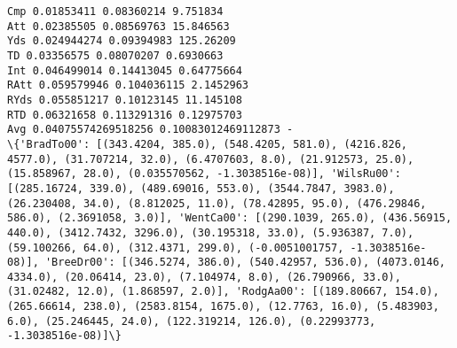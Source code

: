 \documentclass[11pt]{article}
\begin{document}
    \begin{Verbatim}[commandchars=\\\{\}]
Cmp 0.01853411 0.08360214 9.751834
Att 0.02385505 0.08569763 15.846563
Yds 0.024944274 0.09394983 125.26209
TD 0.03356575 0.08070207 0.6930663
Int 0.046499014 0.14413045 0.64775664
RAtt 0.059579946 0.104036115 2.1452963
RYds 0.055851217 0.10123145 11.145108
RTD 0.06321658 0.113291316 0.12975703
Avg 0.04075574269518256 0.10083012469112873 -
\{'BradTo00': [(343.4204, 385.0), (548.4205, 581.0), (4216.826, 4577.0), (31.707214, 32.0), (6.4707603, 8.0), (21.912573, 25.0), (15.858967, 28.0), (0.035570562, -1.3038516e-08)], 'WilsRu00': [(285.16724, 339.0), (489.69016, 553.0), (3544.7847, 3983.0), (26.230408, 34.0), (8.812025, 11.0), (78.42895, 95.0), (476.29846, 586.0), (2.3691058, 3.0)], 'WentCa00': [(290.1039, 265.0), (436.56915, 440.0), (3412.7432, 3296.0), (30.195318, 33.0), (5.936387, 7.0), (59.100266, 64.0), (312.4371, 299.0), (-0.0051001757, -1.3038516e-08)], 'BreeDr00': [(346.5274, 386.0), (540.42957, 536.0), (4073.0146, 4334.0), (20.06414, 23.0), (7.104974, 8.0), (26.790966, 33.0), (31.02482, 12.0), (1.868597, 2.0)], 'RodgAa00': [(189.80667, 154.0), (265.66614, 238.0), (2583.8154, 1675.0), (12.7763, 16.0), (5.483903, 6.0), (25.246445, 24.0), (122.319214, 126.0), (0.22993773, -1.3038516e-08)]\}

    \end{Verbatim}


    
    
    
    
\end{document}
